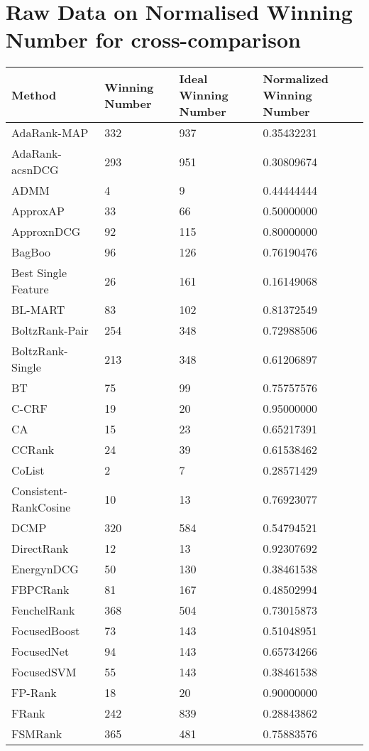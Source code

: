 \chapter{Raw Data on Normalised Winning Number for cross-comparison}
\label{app:norm_winnum_all}

\begin{longtable}{l|l|l|l}
Method & Winning Number & Ideal Winning Number & Normalized Winning Number \\
\hline
AdaRank-\acs{MAP} & 332 & 937 & 0.35432231 \\ 
AdaRank-acs{nDCG} & 293 & 951 & 0.30809674 \\ 
ADMM & 4 & 9 & 0.44444444 \\ 
Approx\acs{AP} & 33 & 66 & 0.50000000 \\ 
Approx\acs{nDCG} & 92 & 115 & 0.80000000 \\ 
BagBoo & 96 & 126 & 0.76190476 \\ 
Best Single Feature & 26 & 161 & 0.16149068 \\ 
BL-MART & 83 & 102 & 0.81372549 \\ 
BoltzRank-Pair & 254 & 348 & 0.72988506 \\ 
BoltzRank-Single & 213 & 348 & 0.61206897 \\ 
BT & 75 & 99 & 0.75757576 \\ 
C-CRF & 19 & 20 & 0.95000000 \\ 
CA & 15 & 23 & 0.65217391 \\ 
CCRank & 24 & 39 & 0.61538462 \\ 
CoList & 2 & 7 & 0.28571429 \\ 
Consistent-RankCosine & 10 & 13 & 0.76923077 \\ 
DCMP & 320 & 584 & 0.54794521 \\ 
DirectRank & 12 & 13 & 0.92307692 \\ 
Energy\acs{nDCG} & 50 & 130 & 0.38461538 \\ 
FBPCRank & 81 & 167 & 0.48502994 \\ 
FenchelRank & 368 & 504 & 0.73015873 \\ 
FocusedBoost & 73 & 143 & 0.51048951 \\ 
FocusedNet & 94 & 143 & 0.65734266 \\ 
Focused\acs{SVM} & 55 & 143 & 0.38461538 \\ 
FP-Rank & 18 & 20 & 0.90000000 \\ 
FRank & 242 & 839 & 0.28843862 \\ 
FSMRank & 365 & 481 & 0.75883576 \\ 

\end{longtable}
